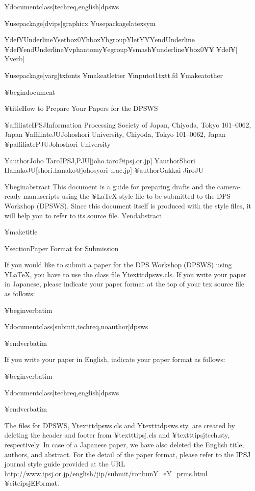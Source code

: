 
¥documentclass[techreq,english]{dpsws}

¥usepackage[dvips]{graphicx}
¥usepackage{latexsym}

¥def¥Underline{¥setbox0¥hbox¥bgroup¥let¥¥¥endUnderline}
¥def¥endUnderline{¥vphantom{y}¥egroup¥smash{¥underline{¥box0}}¥¥}
¥def¥|{¥verb|}


¥usepackage[varg]{txfonts}%
¥makeatletter%
¥input{ot1txtt.fd}
¥makeatother%


¥begin{document}

¥title{How to Prepare Your Papers for the DPSWS}

¥affiliate{IPSJ}{Information Processing Society of Japan, 
Chiyoda, Tokyo 101--0062, Japan}
¥affiliate{JU}{Johoshori University, Chiyoda, Tokyo 101--0062, Japan}
¥paffiliate{PJU}{Johoshori University}

¥author{Joho Taro}{IPSJ,PJU}[joho.taro@ipsj.or.jp]
¥author{Shori Hanako}{JU}[shori.hanako@johosyori-u.ac.jp]
¥author{Gakkai Jiro}{JU}

¥begin{abstract}
This document is a guide for preparing drafts 
and the camera-ready manuscripts using the {¥LaTeX} style file
to be submitted to the DPS Workshop (DPSWS). 
Since this document itself is produced with the style files, 
it will help you to refer to its source file. 
¥end{abstract}


¥maketitle

¥section{Paper Format for Submission}

If you would like to submit a paper 
for the DPS Workshop (DPSWS) using {¥LaTeX}, 
you have to use the class file ¥texttt{dpsws.cls}. 
If you write your paper in Japanese, 
please indicate your paper format 
at the top of your tex source file as follows: 

¥begin{verbatim}

¥documentclass[submit,techreq,noauthor]{dpsws}

¥end{verbatim}

If you write your paper in English, 
indicate your paper format as follows: 

¥begin{verbatim}

¥documentclass[techreq,english]{dpsws}

¥end{verbatim}

The files for DPSWS, ¥texttt{dpsws.cls} and ¥texttt{dpsws.sty}, are created by deleting the header and footer from ¥texttt{ipsj.cls} and ¥texttt{ipsjtech.sty}, respectively.
In case of a Japanese paper, we have also deleted the English title, authors, and abstract.
For the detail of the paper format, 
please refer to the IPSJ journal style guide
provided at the URL
http://www.ipsj.or.jp/english/jip/submit/ronbun¥_e¥_prms.html
¥cite{ipsjEFormat}. 

